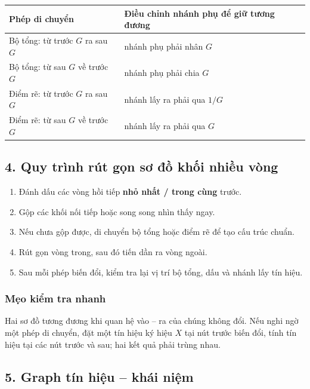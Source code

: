 \begin{center}
\small
\renewcommand{\arraystretch}{1.35}
\begin{tabular}{|p{}|p{}|}
\hline
\textbf{Phép di chuyển} & \textbf{Điều chỉnh nhánh phụ để giữ tương đương}\\
\hline
Bộ tổng: từ trước $G$ ra sau $G$ & nhánh phụ phải nhân $G$\\
\hline
Bộ tổng: từ sau $G$ về trước $G$ & nhánh phụ phải chia $G$\\
\hline
Điểm rẽ: từ trước $G$ ra sau $G$ & nhánh lấy ra phải qua $1/G$\\
\hline
Điểm rẽ: từ sau $G$ về trước $G$ & nhánh lấy ra phải qua $G$\\
\hline
\end{tabular}
\renewcommand{\arraystretch}{1}
\end{center}

\subsection*{4. Quy trình rút gọn sơ đồ khối nhiều vòng}

\begin{enumerate}[leftmargin=1.9em,itemsep=0.2em]
  \item Đánh dấu các vòng hồi tiếp \textbf{nhỏ nhất / trong cùng} trước.
  \item Gộp các khối nối tiếp hoặc song song nhìn thấy ngay.
  \item Nếu chưa gộp được, di chuyển bộ tổng hoặc điểm rẽ để tạo cấu trúc chuẩn.
  \item Rút gọn vòng trong, sau đó tiến dần ra vòng ngoài.
  \item Sau mỗi phép biến đổi, kiểm tra lại vị trí bộ tổng, dấu và nhánh lấy tín hiệu.
\end{enumerate}

\subsubsection*{Mẹo kiểm tra nhanh}

Hai sơ đồ tương đương khi quan hệ vào -- ra của chúng không đổi.
Nếu nghi ngờ một phép di chuyển, đặt một tín hiệu ký hiệu $X$ tại nút trước biến đổi,
tính tín hiệu tại các nút trước và sau; hai kết quả phải trùng nhau.

\subsection*{5. Graph tín hiệu -- khái niệm}

